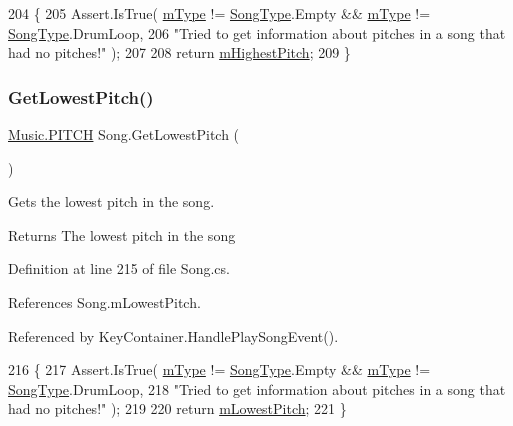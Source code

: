\begin{DoxyCode}
204     \{
205         Assert.IsTrue( \hyperlink{group___song_priv_var_gaf3b9d0f461522324f897b746311b43c5}{mType} != \hyperlink{group___song_enums_gae681a1f001333e39fc1cb4fea97bfe1b}{SongType}.Empty && \hyperlink{group___song_priv_var_gaf3b9d0f461522324f897b746311b43c5}{mType} != 
      \hyperlink{group___song_enums_gae681a1f001333e39fc1cb4fea97bfe1b}{SongType}.DrumLoop,
206             \textcolor{stringliteral}{"Tried to get information about pitches in a song that had no pitches!"} );
207 
208         \textcolor{keywordflow}{return} \hyperlink{group___song_priv_var_ga2dcd39d9add609e9df56a94057441dcc}{mHighestPitch};
209     \}
\end{DoxyCode}
\mbox{\label{group___song_pub_func_gae4e71c8eb059cc9cf0b77e78971ab326}} 
\subsubsection{\texorpdfstring{Get\+Lowest\+Pitch()}{GetLowestPitch()}}
{\footnotesize\ttfamily \hyperlink{group___music_enums_ga508f69b199ea518f935486c990edac1d}{Music.\+P\+I\+T\+CH} Song.\+Get\+Lowest\+Pitch (\begin{DoxyParamCaption}{ }\end{DoxyParamCaption})}



Gets the lowest pitch in the song. 

\begin{DoxyReturn}{Returns}
The lowest pitch in the song 
\end{DoxyReturn}


Definition at line 215 of file Song.\+cs.



References Song.\+m\+Lowest\+Pitch.



Referenced by Key\+Container.\+Handle\+Play\+Song\+Event().


\begin{DoxyCode}
216     \{
217         Assert.IsTrue( \hyperlink{group___song_priv_var_gaf3b9d0f461522324f897b746311b43c5}{mType} != \hyperlink{group___song_enums_gae681a1f001333e39fc1cb4fea97bfe1b}{SongType}.Empty && \hyperlink{group___song_priv_var_gaf3b9d0f461522324f897b746311b43c5}{mType} != 
      \hyperlink{group___song_enums_gae681a1f001333e39fc1cb4fea97bfe1b}{SongType}.DrumLoop,
218             \textcolor{stringliteral}{"Tried to get information about pitches in a song that had no pitches!"} );
219 
220         \textcolor{keywordflow}{return} \hyperlink{group___song_priv_var_ga293976ef4c2050687a81edfbf77b4fc1}{mLowestPitch};
221     \}
\end{DoxyCode}
\mbox{\label{group___song_pub_func_ga705c433f2bfb5aede337698144b23c8b}} 
